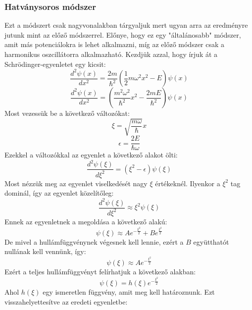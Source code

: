 \documentclass[../main.tex]{subfiles}
\begin{document}
\subsubsection*{Hatványsoros módszer}
Ezt a módszert csak nagyvonalakban tárgyaljuk mert ugyan arra az eredményre jutunk mint az előző módszerrel. Előnye,
hogy ez egy "általánosabb" módszer, amit más potenciálokra is lehet alkalmazni, míg az előző módszer csak a harmonikus oszcillátorra alkalmazható.
Kezdjük azzal, hogy írjuk át a Schrödinger-egyenletet egy kicsit:
\begin{equation}
    \frac{d^2 \psi(x)}{dx^2} = \frac{2m}{\hbar^2} \left( \frac{1}{2} m \omega^2 x^2 - E \right) \psi(x)
\end{equation}
\begin{equation}
    \frac{d^2 \psi(x)}{dx^2} = \left( \frac{m^2 \omega^2}{\hbar^2} x^2 - \frac{2mE}{\hbar^2} \right) \psi(x)
\end{equation}
Most vezessük be a következő változókat:
\begin{equation}
    \xi = \sqrt{\frac{m \omega}{\hbar}} x
\end{equation}
\begin{equation}
    \epsilon = \frac{2E}{\hbar \omega}
\end{equation}
Ezekkel a változókkal az egyenlet a következő alakot ölti:
\begin{equation}
    \frac{d^2 \psi(\xi)}{d \xi^2} = (\xi^2 - \epsilon) \psi(\xi)
\end{equation}
Most nézzük meg az egyenlet viselkedését nagy $\xi$ értékeknél. Ilyenkor a $\xi^2$ tag dominál, így az egyenlet közelítőleg:
\begin{equation}
    \frac{d^2 \psi(\xi)}{d \xi^2} \approx \xi^2 \psi(\xi)
\end{equation}
Ennek az egyenletnek a megoldása a következő alakú:
\begin{equation}
    \psi(\xi) \approx A e^{- \frac{\xi^2}{2}} + B e^{\frac{\xi^2}{2}}
\end{equation}
De mivel a hullámfüggvénynek végesnek kell lennie, ezért a $B$ együtthatót nullának kell vennünk, így:
\begin{equation}
    \psi(\xi) \approx A e^{- \frac{\xi^2}{2}}
\end{equation}
Ezért a teljes hullámfüggvényt felírhatjuk a következő alakban:
\begin{equation}
    \psi(\xi) = h(\xi) e^{- \frac{\xi^2}{2}}
\end{equation}
Ahol $h(\xi)$ egy ismeretlen függvény, amit meg kell határoznunk. Ezt visszahelyettesítve az eredeti egyenletbe:
\end{document}
